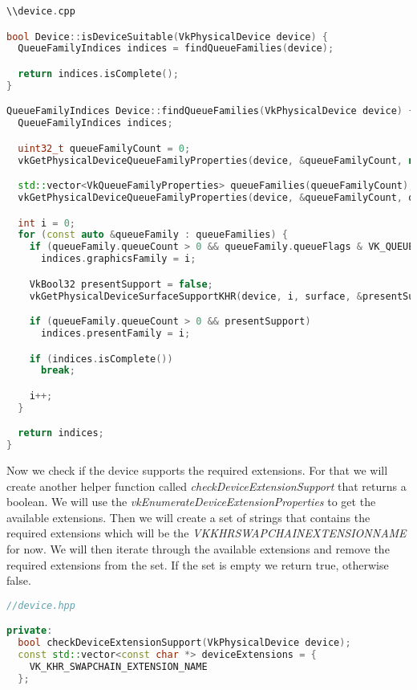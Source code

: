 \documentclass[12pt]{report} \usepackage{preamble}
\begin{document}
\begin{lstlisting}[language=C++]
\\device.cpp

bool Device::isDeviceSuitable(VkPhysicalDevice device) {
  QueueFamilyIndices indices = findQueueFamilies(device);

  return indices.isComplete();
}

QueueFamilyIndices Device::findQueueFamilies(VkPhysicalDevice device) {
  QueueFamilyIndices indices;

  uint32_t queueFamilyCount = 0;
  vkGetPhysicalDeviceQueueFamilyProperties(device, &queueFamilyCount, nullptr);

  std::vector<VkQueueFamilyProperties> queueFamilies(queueFamilyCount);
  vkGetPhysicalDeviceQueueFamilyProperties(device, &queueFamilyCount, queueFamilies.data());

  int i = 0;
  for (const auto &queueFamily : queueFamilies) {
    if (queueFamily.queueCount > 0 && queueFamily.queueFlags & VK_QUEUE_GRAPHICS_BIT)
      indices.graphicsFamily = i;

    VkBool32 presentSupport = false;
    vkGetPhysicalDeviceSurfaceSupportKHR(device, i, surface, &presentSupport);

    if (queueFamily.queueCount > 0 && presentSupport)
      indices.presentFamily = i;

    if (indices.isComplete())
      break;

    i++;
  }

  return indices;
}
\end{lstlisting}

Now we check if the device supports the required extensions. For that we will create another helper function
called \textit{checkDeviceExtensionSupport} that returns a boolean. We will use the \textit{vkEnumerateDeviceExtensionProperties}
to get the available extensions. Then we will create a set of strings that contains the required extensions which will be the
\textit{VK\textunderscore KHR\textunderscore SWAPCHAIN\textunderscore EXTENSION\textunderscore NAME} for now. We will then iterate through
the available extensions and remove the required extensions from the set. If the set is empty we return true, otherwise false.

\begin{lstlisting}[language=C++]
//device.hpp

private:
  bool checkDeviceExtensionSupport(VkPhysicalDevice device);
  const std::vector<const char *> deviceExtensions = {
    VK_KHR_SWAPCHAIN_EXTENSION_NAME
  };
\end{lstlisting}
\end{document}
